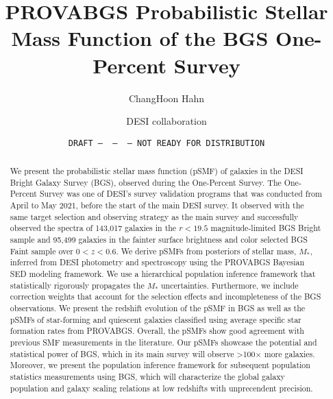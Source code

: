 \documentclass[12pt, letterpaper, preprint, comicneue]{aastex63}
\begin{document}
 \sloppy\sloppypar\frenchspacing 

\title{PROVABGS Probabilistic Stellar Mass Function of the BGS One-Percent
Survey} 
\date{\texttt{DRAFT~---~\githash~---~\gitdate~---~NOT READY FOR DISTRIBUTION}}

\author{ChangHoon Hahn}
\author{DESI collaboration} 

\begin{abstract}
    We present the probabilistic stellar mass function (pSMF) of galaxies in
    the DESI Bright Galaxy Survey (BGS), observed during the One-Percent
    Survey. 
    The One-Percent Survey was one of DESI's survey validation programs that
    was conducted from April to May 2021, before the start of the main DESI
    survey. 
    It observed with the same target selection and observing strategy as the
    main survey and successfully observed the spectra of 143,017 galaxies in
    the $r < 19.5$ magnitude-limited BGS Bright sample and 95,499 galaxies in
    the fainter surface brightness and color selected BGS Faint sample over 
    $0 < z < 0.6$.
    We derive pSMFs from posteriors of stellar mass, $M_*$, inferred from
    DESI photometry and spectroscopy using the \cite{hahn2022} PROVABGS
    Bayesian SED modeling framework. 
    We use a hierarchical population inference framework that statistically
    rigorously propagates the $M_*$ uncertainties. 
    Furthermore, we include correction weights that account for the selection
    effects and incompleteness of the BGS observations. 
    We present the redshift evolution of the pSMF in BGS as well as the pSMFs
    of star-forming and quiescent galaxies classified using average specific
    star formation rates from PROVABGS. 
    Overall, the pSMFs show good agreement with previous SMF measurements in
    the literature. 
    Our pSMFs showcase the potential and statistical power of BGS, which in its
    main survey will observe >100$\times$ more galaxies.
    Moreover, we present the population inference framework for subsequent
    population statistics measurements using BGS, which will characterize the
    global galaxy population and galaxy scaling relations at low redshifts with
    unprecendent precision. 
\end{abstract}

\end{document}
